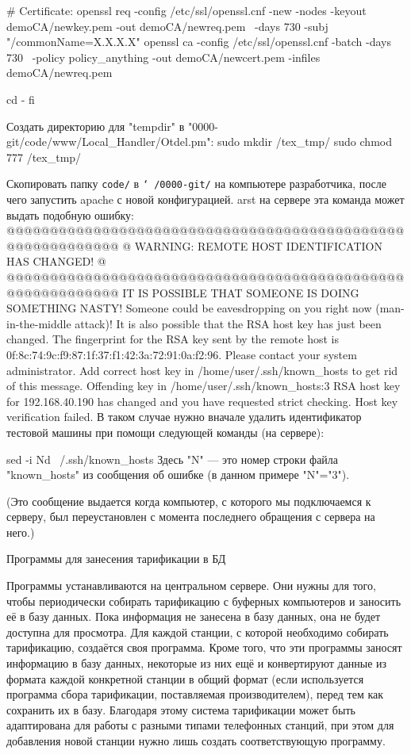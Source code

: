   # Certificate:
  openssl req -config /etc/ssl/openssl.cnf -new -nodes -keyout demoCA/newkey.pem -out demoCA/newreq.pem \
    -days 730 -subj "/commonName=X.X.X.X"
  openssl ca -config /etc/ssl/openssl.cnf -batch -days 730 \
    -policy policy_anything -out demoCA/newcert.pem -infiles demoCA/newreq.pem

  cd -
fi
\endtt
\medskip

\N
Создать директорию для "tempdir" в "0000-git/code/www/Local_Handler/Otdel.pm":
\begtt
sudo mkdir /tex_tmp/
sudo chmod 777 /tex_tmp/
\endtt
\medskip

\N
Скопировать папку {\tt code/} в {\tt \char`~/0000-git/} на компьютере разработчика, после чего запустить apache с новой конфигурацией.
\begintt
arst
\endtt
{} на сервере эта команда может выдать подобную ошибку:
\begtt
@@@@@@@@@@@@@@@@@@@@@@@@@@@@@@@@@@@@@@@@@@@@@@@@@@@@@@@@@@@
@    WARNING: REMOTE HOST IDENTIFICATION HAS CHANGED!     @
@@@@@@@@@@@@@@@@@@@@@@@@@@@@@@@@@@@@@@@@@@@@@@@@@@@@@@@@@@@
IT IS POSSIBLE THAT SOMEONE IS DOING SOMETHING NASTY!
Someone could be eavesdropping on you right now (man-in-the-middle attack)!
It is also possible that the RSA host key has just been changed.
The fingerprint for the RSA key sent by the remote host is
0f:8c:74:9c:f9:87:1f:37:f1:42:3a:72:91:0a:f2:96.
Please contact your system administrator.
Add correct host key in /home/user/.ssh/known_hosts to get rid of this message.
Offending key in /home/user/.ssh/known_hosts:3
RSA host key for 192.168.40.190 has changed and you have requested strict checking.
Host key verification failed.
\endtt
\noindent В таком случае нужно вначале удалить идентификатор тестовой машины при помощи следующей команды (на сервере): \par\nobreak
\begtt
sed -i Nd ~/.ssh/known_hosts
\endtt
\noindent Здесь "N" --- это номер строки файла "known_hosts" из сообщения об ошибке (в данном примере "N"="3"). \par
\noindent (Это сообщение выдается когда компьютер, с которого мы подключаемся к серверу, был переустановлен с момента последнего обращения с сервера на него.)

\vfill
\eject
\sec Программы для занесения тарификации в БД

\bigskip

\noindent
Программы устанавливаются на центральном сервере. Они нужны для того, чтобы периодически собирать тарификацию с буферных компьютеров и заносить её в базу данных. Пока информация не занесена в базу данных, она не будет доступна для просмотра.
\smallskip
\noindent
Для каждой станции, с которой необходимо собирать тарификацию, создаётся своя программа. Кроме того, что эти программы заносят информацию в базу данных, некоторые из них ещё и конвертируют данные из формата каждой конкретной станции в общий формат (если используется программа сбора тарификации, поставляемая производителем), перед тем как сохранить их в базу. Благодаря этому система тарификации может быть адаптирована для работы с разными типами телефонных станций, при этом для добавления новой станции нужно лишь создать соответствующую программу.
\bigskip

